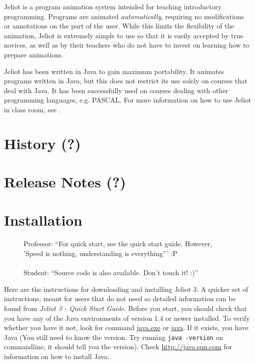 \documentclass[a4paper,11pt,english]{article}
\newcommand{\jel}{Jeliot}
\newcommand{\file}{\url}
\newcommand{\p}[1]{\texttt{#1}}
\begin{document}
\jel{} is a program animation system intended for teaching introductory programming. Programs are animated \emph{automatically}, requiring no modifications or annotations on the part of the user. While this limits the flexibility of the animation, \jel{} is extremely simple to use so that it is easily accepted by true novices, as well as by their teachers who do not have to invest on learning how to prepare animations.

\jel{} has been written in Java to gain maximum portability. It animates programs written in Java, but this does not restrict its use solely on courses that deal with Java. It has been successfully used on courses dealing with other programming languages, e.g. PASCAL. For more information on how to use \jel{} in class room, see \cite{ronit}.


\section{History (?)}
\section{Release Notes (?)}

\section{Installation}

\begin{figure}
\vspace{-13pt}
Professor: ``For quick start, see the quick start guide. However, 'Speed is nothing, understanding is everything''' :P \\ \\
Student: ``Source code is also available. Don't touch it! :)''
\end{figure}

Here are the instructions for downloading and installing \jel{} 3. A quicker set of instructions, meant for users that do not need so detailed information can be found from \emph{Jeliot 3 - Quick Start Guide}. Before you start, you should check that you have any of the Java environments of version 1.4 or newer installed. To verify whether you have it not, look for command \file{java.exe} or \file{java}. If it exists, you have Java (You still need to know the version. Try running \p{java -version} on commandline, it should tell you the version). Check \url{http://java.sun.com} for information on how to install Java.
\end{document}
